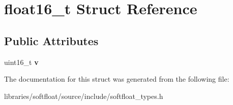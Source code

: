 \hypertarget{structfloat16__t}{}\section{float16\+\_\+t Struct Reference}
\label{structfloat16__t}
\subsection*{Public Attributes}
\begin{DoxyCompactItemize}
\item 
\mbox{\label{structfloat16__t_af4449b76c5734827c0a3a04f89ef9597}} 
uint16\+\_\+t {\bfseries v}
\end{DoxyCompactItemize}


The documentation for this struct was generated from the following file\+:\begin{DoxyCompactItemize}
\item 
libraries/softfloat/source/include/softfloat\+\_\+types.\+h\end{DoxyCompactItemize}
